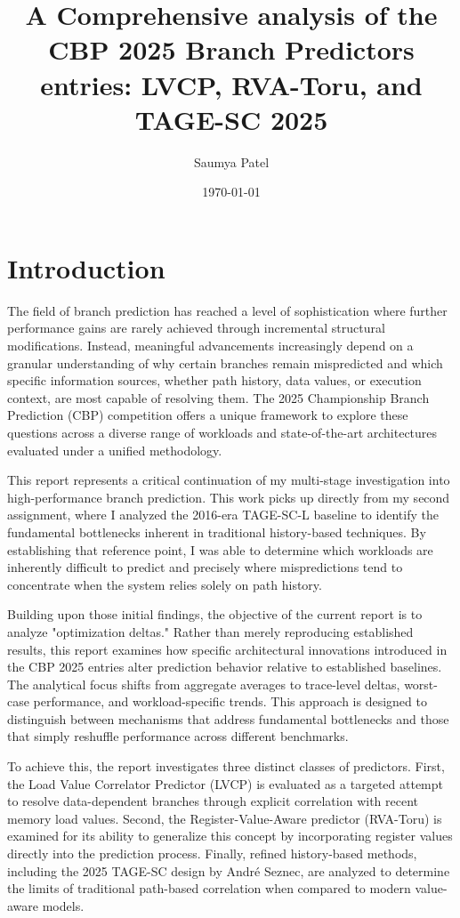 \documentclass[11pt,a4paper]{article}
\title{\textbf{A Comprehensive analysis of the CBP 2025 Branch Predictors entries: LVCP, RVA-Toru, and TAGE-SC 2025}}
\author{Saumya Patel}
\date{\today}
\begin{document}
\maketitle
\thispagestyle{empty}
\tableofcontents
\newpage

\setcounter{page}{1}

\section{Introduction}

The field of branch prediction has reached a level of sophistication where further performance gains are rarely achieved through incremental structural modifications. Instead, meaningful advancements increasingly depend on a granular understanding of why certain branches remain mispredicted and which specific information sources, whether path history, data values, or execution context, are most capable of resolving them. The 2025 Championship Branch Prediction (CBP) competition offers a unique framework to explore these questions across a diverse range of workloads and state-of-the-art architectures evaluated under a unified methodology.

This report represents a critical continuation of my multi-stage investigation into high-performance branch prediction. This work picks up directly from my second assignment, where I analyzed the 2016-era TAGE-SC-L baseline to identify the fundamental bottlenecks inherent in traditional history-based techniques. By establishing that reference point, I was able to determine which workloads are inherently difficult to predict and precisely where mispredictions tend to concentrate when the system relies solely on path history.

Building upon those initial findings, the objective of the current report is to analyze "optimization deltas." Rather than merely reproducing established results, this report examines how specific architectural innovations introduced in the CBP 2025 entries alter prediction behavior relative to established baselines. The analytical focus shifts from aggregate averages to trace-level deltas, worst-case performance, and workload-specific trends. This approach is designed to distinguish between mechanisms that address fundamental bottlenecks and those that simply reshuffle performance across different benchmarks.

To achieve this, the report investigates three distinct classes of predictors. First, the Load Value Correlator Predictor (LVCP) is evaluated as a targeted attempt to resolve data-dependent branches through explicit correlation with recent memory load values. Second, the Register-Value-Aware predictor (RVA-Toru) is examined for its ability to generalize this concept by incorporating register values directly into the prediction process. Finally, refined history-based methods, including the 2025 TAGE-SC design by André Seznec, are analyzed to determine the limits of traditional path-based correlation when compared to modern value-aware models.
\end{document}
